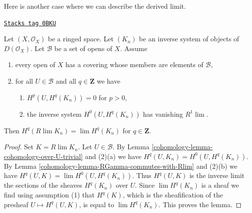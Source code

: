Here is another case where we can describe the derived limit.

\begin{lemma}
\label{cohomology-lemma-derived-limit-suitable-system}
\href{https://stacks.math.columbia.edu/tag/0BKU}{\texttt{Stacks tag 0BKU}}

Let $(X, \mathcal{O}_X)$ be a ringed space. Let $(K_n)$
be an inverse system of objects of $D(\mathcal{O}_X)$.
Let $\mathcal{B}$ be a set of opens of $X$. Assume
\begin{enumerate}
\item every open of $X$ has a covering whose members are
elements of $\mathcal{B}$,
\item for all $U \in \mathcal{B}$ and all $q \in \mathbf{Z}$ we have
\begin{enumerate}
\item $H^p(U, H^q(K_n)) = 0$ for $p > 0$,
\item the inverse system $H^0(U, H^q(K_n))$ has vanishing $R^1\lim$.
\end{enumerate}
\end{enumerate}
Then $H^q(R\lim K_n) = \lim H^q(K_n)$ for $q \in \mathbf{Z}$.
\end{lemma}

\begin{proof}

Set $K = R\lim K_n$. Let $U \in \mathcal{B}$.
By Lemma \ref{cohomology-lemma-cohomology-over-U-trivial} and (2)(a)
we have $H^q(U, K_n) = H^0(U, H^q(K_n))$. By
Lemma \ref{cohomology-lemma-RGamma-commutes-with-Rlim} and (2)(b) we have
$H^q(U, K) = \lim H^0(U, H^q(K_n))$. Thus $H^q(U, K)$ is the inverse limit
the sections of the sheaves $H^q(K_n)$ over $U$. Since
$\lim H^q(K_n)$ is a sheaf we find using assumption (1) that $H^q(K)$,
which is the sheafification of the presheaf $U \mapsto H^q(U, K)$,
is equal to $\lim H^q(K_n)$. This proves the lemma.
\end{proof}


